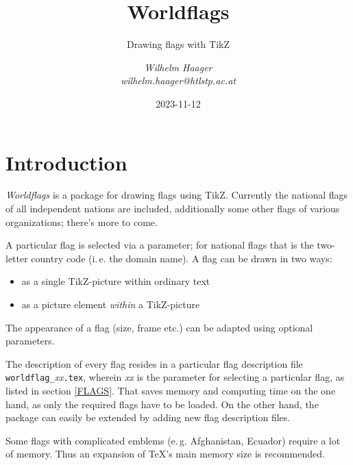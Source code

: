 \documentclass[11pt,a4paper,headsepline,fleqn]{scrreprt}
\begin{document}
\title{Worldflags}
\subtitle{Drawing flags with TikZ}
\author{\slshape Wilhelm Haager\\\slshape wilhelm.haager@htlstp.ac.at}
\vfill
\vfill
\date{2023-11-12}
\vfill
\maketitle

 \tableofcontents

\chapter{Introduction}

\emph{Worldflags} is a package for drawing flags using TikZ.
Currently the national flags of all independent nations are included,
additionally some other flags of various organizations;
there's more to come.

A particular flag is selected via a parameter; for national flags that is the
two-letter country code (i.\,e. the domain name).
A flag can be drawn in two ways:
\begin{itemize}
\item as a single TikZ-picture within ordinary text
\item as a picture element \emph{within} a TikZ-picture
\end{itemize}

The appearance of a flag (size, frame etc.) can be adapted using
optional parameters.

The description of every flag resides in a particular flag description file
{\color{emphcolor}\texttt{worldflag\_}\textit{xx}\texttt{.tex}},
wherein \textit{xx} is the parameter for selecting a particular flag,
as listed in section \ref{FLAGS}.
That saves memory and computing time on the one hand,
as only the required flags have to be loaded.
On the other hand, the package can easily be extended by adding new
flag description files.

Some flags with complicated emblems (e.\,g. Afghanistan, Ecuador)
require a lot of memory. Thus an expansion of \TeX's main memory size
is recommended.
\end{document}
